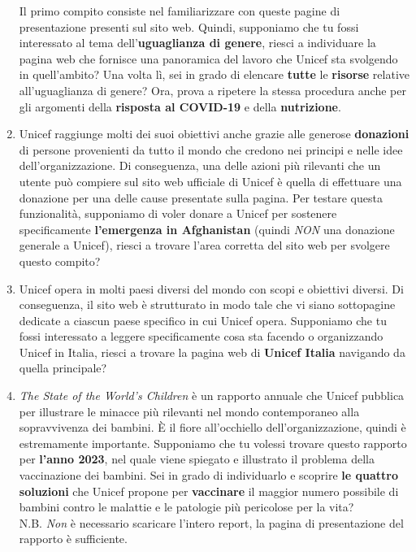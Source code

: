 \documentclass[11pt]{article}
\begin{document}
\begin{Form}
\begin{enumerate}
			
			Il primo compito consiste nel familiarizzare con queste pagine di presentazione presenti sul sito web. Quindi, supponiamo che tu fossi interessato al tema dell'\textbf{uguaglianza di genere}, riesci a individuare la pagina web che fornisce una panoramica del lavoro che Unicef sta svolgendo in quell'ambito? Una volta lì, sei in grado di elencare \textbf{tutte} le \textbf{risorse} relative all'uguaglianza di genere?
			Ora, prova a ripetere la stessa procedura anche per gli argomenti della \textbf{risposta al COVID-19} e della \textbf{nutrizione}.
			
			
			\item Unicef raggiunge molti dei suoi obiettivi anche grazie alle generose \textbf{donazioni} di persone provenienti da tutto il mondo che credono nei principi e nelle idee dell'organizzazione. Di conseguenza, una delle azioni più rilevanti che un utente può compiere sul sito web ufficiale di Unicef è quella di effettuare una donazione per una delle cause presentate sulla pagina. Per testare questa funzionalità, supponiamo di voler donare a Unicef per sostenere specificamente \textbf{l'emergenza in Afghanistan} (quindi \textit{NON} una donazione generale a Unicef), riesci a trovare l'area corretta del sito web per svolgere questo compito?
			
			\item Unicef opera in molti paesi diversi del mondo con scopi e obiettivi diversi. Di conseguenza, il sito web è strutturato in modo tale che vi siano sottopagine dedicate a ciascun paese specifico in cui Unicef opera. Supponiamo che tu fossi interessato a leggere specificamente cosa sta facendo o organizzando Unicef in Italia, riesci a trovare la pagina web di \textbf{Unicef Italia} navigando da quella principale?
			
			\item \textit{The State of the World's Children} è un rapporto annuale che Unicef pubblica per illustrare le minacce più rilevanti nel mondo contemporaneo alla sopravvivenza dei bambini. È il fiore all'occhiello dell'organizzazione, quindi è estremamente importante. Supponiamo che tu volessi trovare questo rapporto per \textbf{l'anno 2023}, nel quale viene spiegato e illustrato il problema della vaccinazione dei bambini. Sei in grado di individuarlo e scoprire \textbf{le quattro soluzioni} che Unicef propone per \textbf{vaccinare} il maggior numero possibile di bambini contro le malattie e le patologie più pericolose per la vita?\\
			N.B. \textit{Non} è necessario scaricare l'intero report, la pagina di presentazione del rapporto è sufficiente.
			

\end{enumerate}
\end{Form}
\end{document}
